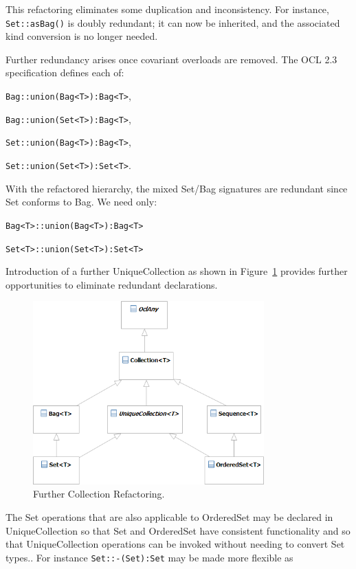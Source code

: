 \documentclass{eceasst}
\begin{document}
This refactoring eliminates some duplication and inconsistency. For instance, \verb|Set::asBag()| is doubly redundant;  it can now be inherited, and the associated kind conversion is no longer needed.

Further redundancy arises once covariant overloads are removed. The OCL 2.3 specification defines each of:

\verb|Bag::union(Bag<T>):Bag<T>|,

\verb|Bag::union(Set<T>):Bag<T>|,

\verb|Set::union(Bag<T>):Bag<T>|,

\verb|Set::union(Set<T>):Set<T>|.

With the refactored hierarchy, the mixed Set/Bag signatures are redundant since Set conforms to Bag. We need only:

\verb|Bag<T>::union(Bag<T>):Bag<T>|

\verb|Set<T>::union(Set<T>):Set<T>|

Introduction of a further UniqueCollection as shown in Figure~\ref{fig:Collections_2_4} provides further opportunities to eliminate redundant declarations.

\begin{figure}
  \begin{center}
    \includegraphics[width=3.5in]{Collections_2_4.png}
  \end{center}
  \caption{Further Collection Refactoring.}
  \label{fig:Collections_2_4}
\end{figure}

The Set operations that are also applicable to OrderedSet may be declared in UniqueCollection so that Set and OrderedSet have consistent functionality and so that UniqueCollection operations can be invoked without needing to convert Set types.. For instance \verb|Set::-(Set):Set| may be made more flexible as
\end{document}
